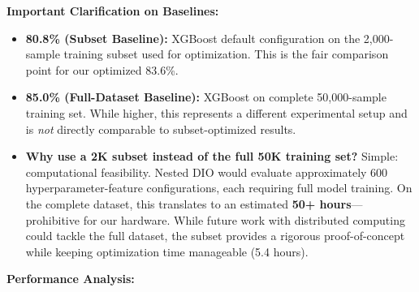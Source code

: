 \documentclass[12pt, a4paper]{article}
\begin{document}
\textbf{Important Clarification on Baselines:}
\begin{itemize}
    \item \textbf{80.8\% (Subset Baseline):} XGBoost default configuration on the 2,000-sample training subset used for optimization. This is the fair comparison point for our optimized 83.6\%.
    \item \textbf{85.0\% (Full-Dataset Baseline):} XGBoost on complete 50,000-sample training set. While higher, this represents a different experimental setup and is \textit{not} directly comparable to subset-optimized results.
    \item \textbf{Why use a 2K subset instead of the full 50K training set?} Simple: computational feasibility. Nested DIO would evaluate approximately 600 hyperparameter-feature configurations, each requiring full model training. On the complete dataset, this translates to an estimated \textbf{50+ hours}—prohibitive for our hardware. While future work with distributed computing could tackle the full dataset, the subset provides a rigorous proof-of-concept while keeping optimization time manageable (5.4 hours).
\end{itemize}

\textbf{Performance Analysis:}
\end{document}
